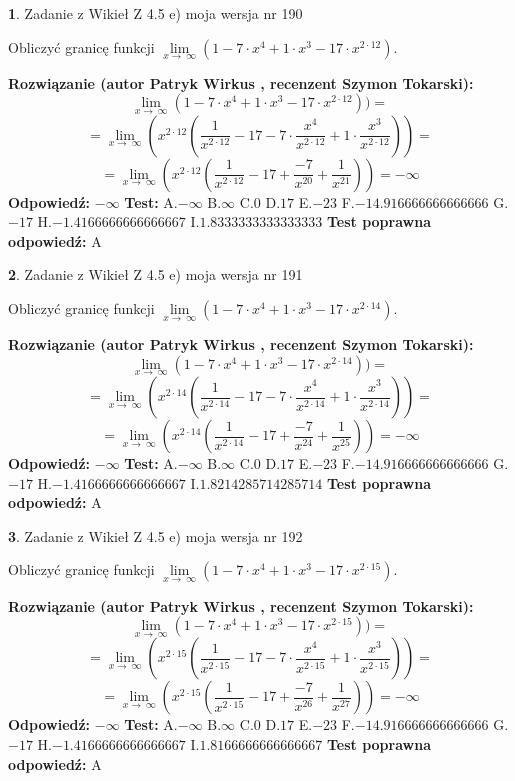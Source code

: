 \documentclass[12pt, a4paper]{article}
\theoremstyle{definition} %
\newtheorem{zad}{}
\newcommand{\zadStart}[1]{\begin{zad}#1\newline}
\newcommand{\zadStop}{\end{zad}}
\newcommand{\rozwStart}[2]{\noindent \textbf{Rozwiązanie (autor #1 , recenzent #2): }\newline}
\newcommand{\rozwStop}{\newline}
\newcommand{\odpStart}{\noindent \textbf{Odpowiedź:}\newline}
\newcommand{\odpStop}{\newline}
\newcommand{\testStart}{\noindent \textbf{Test:}\newline}
\newcommand{\testStop}{\newline}
\newcommand{\kluczStart}{\noindent \textbf{Test poprawna odpowiedź:}\newline}
\newcommand{\kluczStop}{\newline}
\begin{document}
\zadStart{Zadanie z Wikieł Z 4.5 e) moja wersja nr 190}


Obliczyć granicę funkcji  $\lim\limits_{x\to\ \infty}(1 - 7 \cdot x^{4}+1 \cdot x^{3}- 17 \cdot x^{2\cdot12})$.
\zadStop
\rozwStart{Patryk Wirkus}{Szymon Tokarski}
$$\lim\limits_{x\to\ \infty}(1 - 7 \cdot x^{4}+1 \cdot x^{3}- 17 \cdot x^{2\cdot12}))=$$
$$=\lim\limits_{x\to\ \infty}(x^{2\cdot12}(\frac{1}{x^{2\cdot12}}-17 -7 \cdot \frac{x^{4}}{x^{2\cdot12}}+1 \cdot \frac{x^{3}}{x^{2\cdot12}}))=$$
$$=\lim\limits_{x\to\ \infty}(x^{2\cdot12}(\frac{1}{x^{2\cdot12}}-17 + \frac{-7}{x^{20}}+ \frac{1}{x^{21}}))=-\infty$$
\rozwStop
\odpStart
$-\infty$
\odpStop
\testStart
A.$-\infty$ B.$\infty$ C.$0$ D.$17$ E.$-23$
F.$-14.916666666666666$ G.$-17$
H.$-1.4166666666666667$
I.$1.8333333333333333$
\testStop
\kluczStart
A
\kluczStop



\zadStart{Zadanie z Wikieł Z 4.5 e) moja wersja nr 191}


Obliczyć granicę funkcji  $\lim\limits_{x\to\ \infty}(1 - 7 \cdot x^{4}+1 \cdot x^{3}- 17 \cdot x^{2\cdot14})$.
\zadStop
\rozwStart{Patryk Wirkus}{Szymon Tokarski}
$$\lim\limits_{x\to\ \infty}(1 - 7 \cdot x^{4}+1 \cdot x^{3}- 17 \cdot x^{2\cdot14}))=$$
$$=\lim\limits_{x\to\ \infty}(x^{2\cdot14}(\frac{1}{x^{2\cdot14}}-17 -7 \cdot \frac{x^{4}}{x^{2\cdot14}}+1 \cdot \frac{x^{3}}{x^{2\cdot14}}))=$$
$$=\lim\limits_{x\to\ \infty}(x^{2\cdot14}(\frac{1}{x^{2\cdot14}}-17 + \frac{-7}{x^{24}}+ \frac{1}{x^{25}}))=-\infty$$
\rozwStop
\odpStart
$-\infty$
\odpStop
\testStart
A.$-\infty$ B.$\infty$ C.$0$ D.$17$ E.$-23$
F.$-14.916666666666666$ G.$-17$
H.$-1.4166666666666667$
I.$1.8214285714285714$
\testStop
\kluczStart
A
\kluczStop



\zadStart{Zadanie z Wikieł Z 4.5 e) moja wersja nr 192}


Obliczyć granicę funkcji  $\lim\limits_{x\to\ \infty}(1 - 7 \cdot x^{4}+1 \cdot x^{3}- 17 \cdot x^{2\cdot15})$.
\zadStop
\rozwStart{Patryk Wirkus}{Szymon Tokarski}
$$\lim\limits_{x\to\ \infty}(1 - 7 \cdot x^{4}+1 \cdot x^{3}- 17 \cdot x^{2\cdot15}))=$$
$$=\lim\limits_{x\to\ \infty}(x^{2\cdot15}(\frac{1}{x^{2\cdot15}}-17 -7 \cdot \frac{x^{4}}{x^{2\cdot15}}+1 \cdot \frac{x^{3}}{x^{2\cdot15}}))=$$
$$=\lim\limits_{x\to\ \infty}(x^{2\cdot15}(\frac{1}{x^{2\cdot15}}-17 + \frac{-7}{x^{26}}+ \frac{1}{x^{27}}))=-\infty$$
\rozwStop
\odpStart
$-\infty$
\odpStop
\testStart
A.$-\infty$ B.$\infty$ C.$0$ D.$17$ E.$-23$
F.$-14.916666666666666$ G.$-17$
H.$-1.4166666666666667$
I.$1.8166666666666667$
\testStop
\kluczStart
A
\kluczStop
\end{document}
